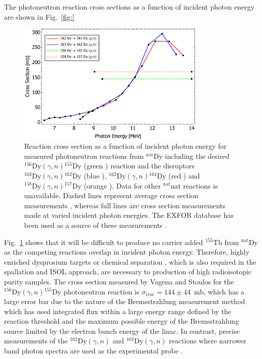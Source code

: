 \documentclass[../main.tex]{subfiles}
\begin{document}
The photoneutron reaction cross sections as a function of incident photon energy are shown in Fig.~\ref{fig:}
\begin{figure}[!h]
\centering
\includegraphics[width=0.8\textwidth]{Figures/DIANA_Inverse_Compton_Source_Design/DyLandscape.pdf}
\caption{Reaction cross section as a function of incident photon energy for measured photoneutron reactions from $^{\mathrm{nat}}\mathrm{Dy}$ including the desired $^{156}\mathrm{Dy}\left(\gamma,n\right){}^{155}\mathrm{Dy}$ (green \cite{vagena2017photodisintegration}) reaction and the disruptors $^{163}\mathrm{Dy}\left(\gamma,n\right){}^{162}\mathrm{Dy}$ (blue \cite{renstrom2018verification}), $^{162}\mathrm{Dy}\left(\gamma,n\right){}^{161}\mathrm{Dy}$ (red \cite{renstrom2018verification}) and $^{158}\mathrm{Dy}\left(\gamma,n\right){}^{157}\mathrm{Dy}$ (orange \cite{vagena2017photodisintegration}). Data for other $^{\mathrm{nat}}\mathrm{nat}$ reactions is unavailable. Dashed lines represent average cross section measurements \cite{vagena2017photodisintegration}, whereas full lines are cross section measurements made at varied incident photon energies. The EXFOR database has been used as a source of these measurements \cite{zerkin2018experimental}. }
\label{fig:Dy_cross_section_energy)}
\end{figure}

Fig.~\ref{fig:Dy_cross_section_energy)} shows that it will be difficult to produce no carrier added $^{155}\mathrm{Tb}$ from $^{\mathrm{nat}}\mathrm{Dy}$ as the competing reactions overlap in incident photon energy. Therefore, highly enriched dysprosium targets or chemical separation \cite{webster2019chemical}, which is also required in the spallation and ISOL approach, are necessary to production of high radioisotopic purity samples. The cross section measured by Vagena and Stoulos for the $^{156}\mathrm{Dy}\left(\gamma,n\right){}^{155}\mathrm{Dy}$ photoneutron reaction is $\sigma_{\mathrm{reac}} = 144\pm 44$~\si{\milli\barn}, which has a large error bar due to the nature of the Bremsstrahlung measurement method which has used integrated flux  within a large energy range defined by the reaction threshold and the maximum possible energy of the Bremsstrahlung source limited by the electron bunch energy of the linac. In contrast, precise measurements of the $^{162}\mathrm{Dy}\left(\gamma,n\right)$ and $^{163}\mathrm{Dy}\left(\gamma,n\right)$ reactions where narrower band photon spectra are used as the experimental probe \cite{renstrom2018verification}.
\end{document}
